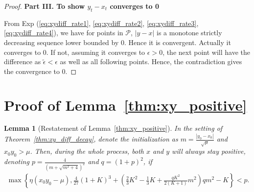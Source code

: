 \documentclass{article}
\theoremstyle{plain}
\newtheorem{lemma}{Lemma}
\theoremstyle{remark}
\newcommand{\red}[1]{{\color{black}#1}}
\begin{document}
\begin{proof}
\red{
\textbf{Part III. To show $y_{t}-x_{t}$ converges to 0}

From Exp (\ref{eq:xydiff_rate1}, \ref{eq:xydiff_rate2}, \ref{eq:xydiff_rate3}, \ref{eq:xydiff_rate4}),
we have for points in $\mathcal{P}$, $|y-x|$ is a monotone strictly decreasing sequence lower bounded by 0. Hence it is convergent. Actually it converges to 0. If not, assuming it converges to $\epsilon>0$, the next point will have the difference as $\tilde{\epsilon}<\epsilon$ as well as all following points. Hence, the contradiction gives the convergence to 0.
}
\end{proof}%

\section{Proof of Lemma~\ref{thm:xy_positive}}
\label{app:xy_positive}


\begin{lemma}[Restatement of Lemma~\ref{thm:xy_positive}]
In the setting of Theorem~\ref{thm:xy_diff_decay}, denote the initialization as $m=\frac{|y_0-x_0|}{\sqrt{\mu}}$ and $x_0 y_0>\mu$. Then, during the whole process, both $x$ and $y$ will always stay positive, denoting $p=\frac{4}{\left( m+\sqrt{m^2+4} \right)^2}$ and $q=(1+p)^2$, if
\begin{align*}
    \max\left\{
    \eta(x_0 y_0-\mu),
    \frac{4}{27}\left(1+K\right)^3+\left(\frac{2}{3}K^2-\frac{1}{3}K+\frac{q K^2}{2(K+1)}m^2\right)q m^2-K
    \right\}
    <
    p.
\end{align*}
\end{lemma}
\end{document}
